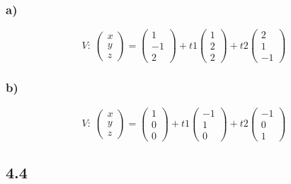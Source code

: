 \documentclass[11pt]{article}
\begin{document}
\subsubsection*{a)}
\[
V:\;\begin{pmatrix}
x\\y\\z
\end{pmatrix}
=
\begin{pmatrix}
1\\-1\\2
\end{pmatrix}
+t1\begin{pmatrix}
1\\2\\2
\end{pmatrix}
+t2\begin{pmatrix}
2\\1\\-1
\end{pmatrix}
\]

\subsubsection*{b)}
\[
V:\;\begin{pmatrix}
x\\y\\z
\end{pmatrix}
=
\begin{pmatrix}
1\\0\\0
\end{pmatrix}
+t1\begin{pmatrix}
-1\\1\\0
\end{pmatrix}
+t2\begin{pmatrix}
-1\\0\\1
\end{pmatrix}
\]

\subsection*{4.4}
\end{document}
